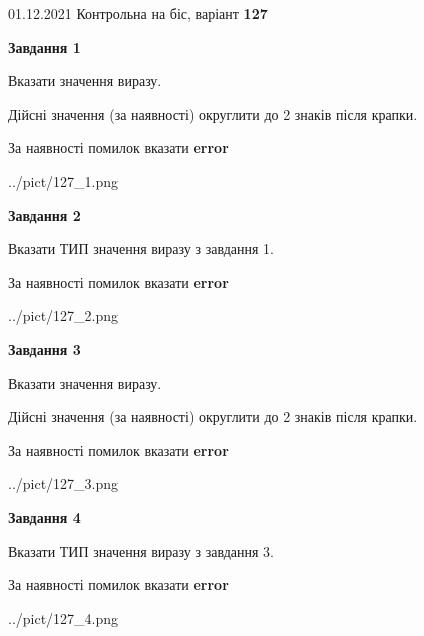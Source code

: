 \documentclass[11pt, ukrainian]{article}
\begin{document}
{01.12.2021 Контрольна на біс, варіант  \No \textbf { 127 }\par}
{
\begin {large}
{\begin {center}\textbf{Завдання 1}\end {center}}\par
Вказати значення виразу. \par
Дійсні значення (за наявності) округлити до 2 знаків після крапки. \par
За наявності помилок вказати \textbf{error}

\begin{center}
	{../pict/127_1.png}
\end{center}
\newpage

{\begin {center}\textbf{Завдання 2}\end {center}}\par
Вказати ТИП значення виразу з завдання 1. \par
За наявності помилок вказати \textbf{error}

\begin{center}
	{../pict/127_2.png}
\end{center}
\newpage

{\begin {center}\textbf{Завдання 3}\end {center}}\par
Вказати значення виразу. \par
Дійсні значення (за наявності) округлити до 2 знаків після крапки. \par
За наявності помилок вказати \textbf{error}

\begin{center}
	{../pict/127_3.png}
\end{center}
\newpage

{\begin {center}\textbf{Завдання 4}\end {center}}\par
Вказати ТИП значення виразу з завдання 3. \par
За наявності помилок вказати \textbf{error}

\begin{center}
	{../pict/127_4.png}
\end{center}
\newpage


\end{large}}
\end{document}
